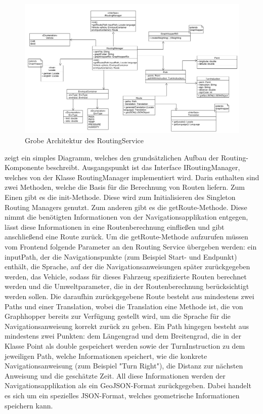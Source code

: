 \begin{figure}[htb]
	\centering
	\includegraphics[width=\textwidth]{./ressourcen/routing/cdRouting.png}
	\caption{Grobe Architektur des RoutingService}
	\label{fig:routing_Klassendiagramm}
\end{figure}

 zeigt ein simples Diagramm, welches den grundsätzlichen Aufbau der Routing-Komponente beschreibt. Ausgangspunkt ist das Interface IRoutingManager, welches von der Klasse RoutingManager implementiert wird. Darin enthalten sind zwei Methoden, welche die Basis für die Berechnung von Routen liefern. Zum Einen gibt es die init-Methode. Diese wird zum Initialisieren des Singleton Routing Managers genutzt. Zum anderen gibt es die getRoute-Methode. Diese nimmt die benötigten Informationen von der Navigationsapplikation entgegen, lässt diese Informationen in eine Routenberechnung einfließen und gibt anschließend eine Route zurück. Um die getRoute-Methode aufzurufen müssen vom Frontend folgende Parameter an den Routing Service übergeben werden: ein inputPath, der die Navigationspunkte (zum Beispiel Start- und Endpunkt) enthält, die Sprache, auf der die Navigationsanweisungen später zurückgegeben werden, das Vehicle, sodass für dieses Fahrzeug spezifizierte Routen berechnet werden und die Umweltparameter, die in der Routenberechnung berücksichtigt werden sollen. Die daraufhin zurückgegebene Route besteht aus mindestens zwei Paths und einer Translation, wobei die Translation eine Methode ist, die von Graphhopper bereits zur Verfügung gestellt wird, um die Sprache für die Navigationsanweisung korrekt zurück zu geben. Ein Path hingegen besteht aus mindestens zwei Punkten: dem Längengrad und dem Breitengrad, die in der Klasse Point als double gespeichert werden sowie der TurnInstruction zu dem jeweiligen Path, welche Informationen speichert, wie die konkrete Navigationsanweisung (zum Beispiel "Turn Right"), die Distanz zur nächsten Anweisung und die geschätzte Zeit. All diese Informationen werden der Navigationsapplikation als ein GeoJSON-Format zurückgegeben. Dabei handelt es sich um ein spezielles JSON-Format, welches geometrische Informationen speichern kann.

